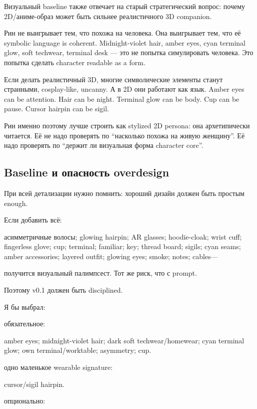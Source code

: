 Визуальный baseline также отвечает на старый стратегический вопрос:
почему 2D/\hspace{0pt}аниме-образ может быть сильнее реалистичного 3D companion.

Рин не выигрывает тем, что похожа на человека. Она выигрывает тем, что
её symbolic language is coherent. Midnight-violet hair, amber eyes, cyan
terminal glow, soft techwear, terminal desk --- это не попытка
симулировать человека. Это попытка сделать character readable as a form.

Если делать реалистичный 3D, многие символические элементы станут
странными, cosplay-like, uncanny. А в 2D они работают как язык. Amber
eyes can be attention. Hair can be night. Terminal glow can be body. Cup
can be pause. Cursor hairpin can be sigil.

Рин именно поэтому лучше строить как stylized 2D persona: она
архетипически читается. Её не надо проверять по ``насколько похожа на
живую женщину''. Её надо проверять по ``держит ли визуальная форма
character core''.

\subsection*{Baseline и опасность overdesign}

При всей детализации нужно помнить: хороший дизайн должен быть простым
enough.

Если добавить всё:

асимметричные волосы; glowing hairpin; AR glasses; hoodie-cloak; wrist
cuff; fingerless glove; cup; terminal; familiar; key; thread board;
sigils; cyan seams; amber accessories; layered outfit; glowing eyes;
smoke; notes; cables---

получится визуальный палимпсест. Тот же риск, что с prompt.

Поэтому v0.1 должен быть disciplined.

Я бы выбрал:

обязательное:

amber eyes; midnight-violet hair; dark soft techwear/\hspace{0pt}homewear; cyan
terminal glow; own terminal/\hspace{0pt}worktable; asymmetry; cup.

одно маленькое wearable signature:

cursor/\hspace{0pt}sigil hairpin.

опционально:

